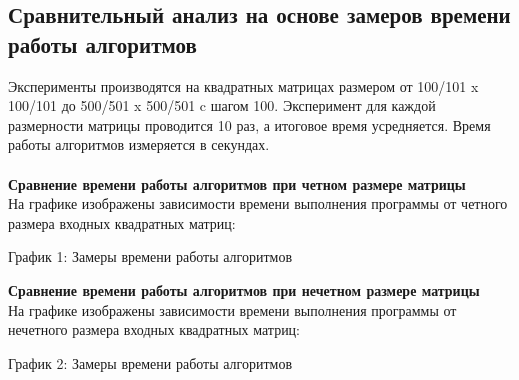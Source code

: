 \documentclass[12pt,a4paper]{article}
\numberwithin{equation}{section}
\begin{document}
\subsection{Сравнительный анализ на основе замеров времени работы алгоритмов}
Эксперименты производятся на квадратных матрицах размером от 100/101 x 100/101 до 500/501 x 500/501 c шагом 100. Эксперимент для каждой размерности матрицы проводится 10 раз, а итоговое время усредняется. Время работы алгоритмов измеряется в секундах.\\\\
\textbf{Сравнение времени работы алгоритмов при четном размере матрицы} \\
На графике изображены  зависимости времени выполнения программы от четного размера входных квадратных матриц: 
\begin{center}
График 1: Замеры времени работы алгоритмов
\end{center}
\textbf{Сравнение времени работы алгоритмов при нечетном размере матрицы} \\
На графике изображены зависимости времени выполнения программы от нечетного размера входных квадратных матриц:  
\begin{center}
График 2: Замеры времени работы алгоритмов
\end{center}
\clearpage
\end{document}
